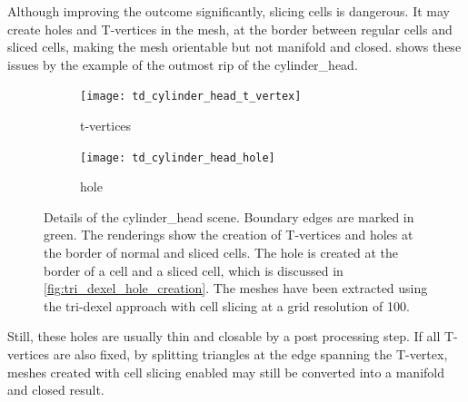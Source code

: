 Although improving the outcome significantly, slicing cells is dangerous.
It may create holes and T-vertices in the mesh, at the border between regular cells and sliced cells, making the mesh orientable but not manifold and closed.
 shows these issues by the example of the outmost rip of the cylinder\_head.
%
\begin{figure}
	\centering
	\begin{subfigure}[b]{0.49\textwidth}
		\centering
		\texttt{[image: td\_cylinder\_head\_t\_vertex]}
		\caption{t-vertices}
		\label{fig:td_cylinder_head_t_vertex}
	\end{subfigure}
	\begin{subfigure}[b]{0.49\textwidth}
		\centering
		\texttt{[image: td\_cylinder\_head\_hole]}
		\caption{hole}
		\label{fig:td_cylinder_head_hole}
	\end{subfigure}
	\caption{
		Details of the cylinder\_head scene.
		Boundary edges are marked in green.
		The renderings show the creation of T-vertices and holes at the border of normal and sliced cells.
		The hole is created at the border of a cell and a sliced cell, which is discussed in \cref{fig:tri_dexel_hole_creation}.
		The meshes have been extracted using the tri-dexel approach with cell slicing at a grid resolution of 100.
	}
	\label{fig:td_cylinder_head_issues}
\end{figure}
%
Still, these holes are usually thin and closable by a post processing step.
If all T-vertices are also fixed, \eg by splitting triangles at the edge spanning the T-vertex, meshes created with cell slicing enabled may still be converted into a manifold and closed result.

